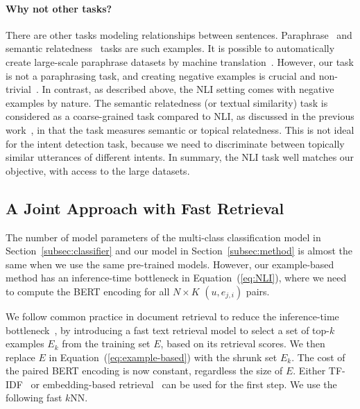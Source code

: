 \paragraph{Why not other tasks?}
There are other tasks modeling relationships between sentences.
Paraphrase~\citep{paranmt} and semantic relatedness~\citep{semeval} tasks are such examples.
It is possible to automatically create large-scale paraphrase datasets by machine translation~\citep{ppdb}.
However, our task is not a paraphrasing task, and creating negative examples is crucial and non-trivial~\citep{selectional-preference}.
In contrast, as described above, the NLI setting comes with negative examples by nature.
The semantic relatedness (or textual similarity) task is considered as a coarse-grained task compared to NLI, as discussed in the previous work~\citep{jmt}, in that the task measures semantic or topical relatedness.
This is not ideal for the intent detection task, because we need to discriminate between topically similar utterances of different intents.
In summary, the NLI task well matches our objective, with access to the large datasets.



\subsection{A Joint Approach with Fast Retrieval}
\label{subsec:joint}

The number of model parameters of the multi-class classification model in Section~\ref{subsec:classifier} and our model in Section~\ref{subsec:method} is almost the same when we use the same pre-trained models.
However, our example-based method has an inference-time bottleneck in Equation~(\ref{eq:NLI}), where we need to compute the BERT encoding for all $N\times K$ $(u, e_{j,i})$ pairs. 

We follow common practice in document retrieval to reduce the inference-time bottleneck~\citep{sem-bert,graph-retriever}, by introducing a fast text retrieval model to select a set of top-$k$ examples $E_k$ from the training set $E$, based on its retrieval scores.
We then replace $E$ in Equation~(\ref{eq:example-based}) with the shrunk set $E_k$.
The cost of the paired BERT encoding is now constant, regardless the size of $E$.
Either TF-IDF~\citep{drqa} or embedding-based retrieval~\citep{faiss,phrase-embedding-index,latent-retrieval} can be used for the first step.
We use the following fast $k$NN.

